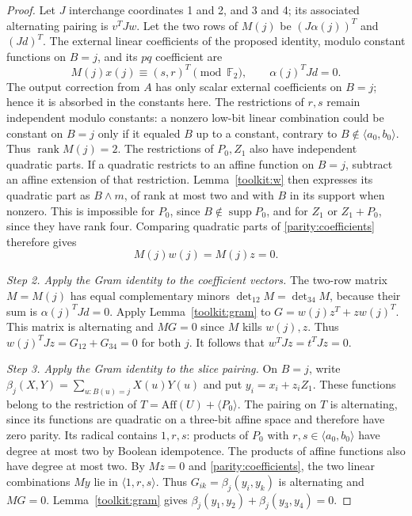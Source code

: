 \documentclass[11pt,a4paper]{article}
\theoremstyle{plain}
\theoremstyle{remark}
\theoremstyle{plain}
\newcommand{\F}{\mathbb F_2}
\newcommand{\Aff}{\mathrm{Aff}}
\newcommand{\supp}{\operatorname{supp}}
\newcommand{\rk}{\operatorname{rank}}
\begin{document}
\begin{proof}
Let $J$ interchange coordinates 1 and 2, and 3 and 4; its associated alternating pairing is $v^TJw$. Let the two rows of $M(j)$ be $(J\alpha(j))^T$ and $(Jd)^T$. The external linear coefficients of the proposed identity, modulo constant functions on $B=j$, and its $pq$ coefficient are
\begin{equation}\label{parity:coefficients}
M(j)x(j)\equiv(s,r)^T\pmod\F,\qquad
\alpha(j)^TJd=0.
\end{equation}
The output correction from $A$ has only scalar external coefficients on $B=j$; hence it is absorbed in the constants here. The restrictions of $r,s$ remain independent modulo constants: a nonzero low-bit linear combination could be constant on $B=j$ only if it equaled $B$ up to a constant, contrary to $B\notin\langle a_0,b_0\rangle$. Thus $\rk M(j)=2$.
The restrictions of $P_0,Z_1$ also have independent quadratic parts. If a quadratic restricts to an affine function on $B=j$, subtract an affine extension of that restriction. Lemma~\ref{toolkit:w} then expresses its quadratic part as $B\wedge m$, of rank at most two and with $B$ in its support when nonzero. This is impossible for $P_0$, since $B\notin\supp P_0$, and for $Z_1$ or $Z_1+P_0$, since they have rank four. Comparing quadratic parts of \eqref{parity:coefficients} therefore gives
\[
M(j)w(j)=M(j)z=0.
\]

\emph{Step 2. Apply the Gram identity to the coefficient vectors.}
The two-row matrix $M=M(j)$ has equal complementary minors $\det_{12}M=\det_{34}M$, because their sum is $\alpha(j)^TJd=0$. Apply Lemma~\ref{toolkit:gram} to $G=w(j)z^T+zw(j)^T$. This matrix is alternating and $MG=0$ since $M$ kills $w(j),z$. Thus $w(j)^TJz=G_{12}+G_{34}=0$ for both $j$. It follows that $w^TJz=t^TJz=0$.

\emph{Step 3. Apply the Gram identity to the slice pairing.}
On $B=j$, write $\beta_j(X,Y)=\sum_{u:B(u)=j}X(u)Y(u)$ and put $y_i=x_i+z_iZ_1$. These functions belong to the restriction of $T=\Aff(U)+\langle P_0\rangle$. The pairing on $T$ is alternating, since its functions are quadratic on a three-bit affine space and therefore have zero parity. Its radical contains $1,r,s$: products of $P_0$ with $r,s\in\langle a_0,b_0\rangle$ have degree at most two by Boolean idempotence. The products of affine functions also have degree at most two. By $Mz=0$ and \eqref{parity:coefficients}, the two linear combinations $My$ lie in $\langle 1,r,s\rangle$. Thus $G_{ik}=\beta_j(y_i,y_k)$ is alternating and $MG=0$. Lemma~\ref{toolkit:gram} gives $\beta_j(y_1,y_2)+\beta_j(y_3,y_4)=0$.


\end{proof}
\end{document}
